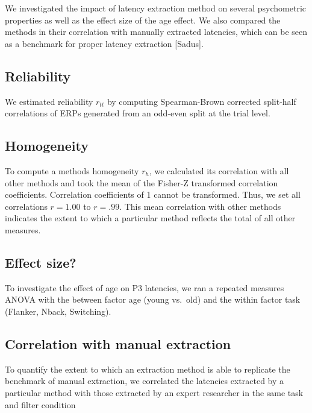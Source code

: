 \documentclass[
  man,floatsintext]{apa7}
\begin{document}
We investigated the impact of latency extraction method on several psychometric properties as well as the effect size of the age effect. We also compared the methods in their correlation with manually extracted latencies, which can be seen as a benchmark for proper latency extraction {[}Sadus{]}.

\hypertarget{reliability}{%
\subsection{Reliability}\label{reliability}}

We estimated reliability \(r_{tt}\) by computing Spearman-Brown corrected split-half correlations of ERPs generated from an odd-even split at the trial level.

\hypertarget{homogeneity}{%
\subsection{Homogeneity}\label{homogeneity}}

To compute a methods homogeneity \(r_h\), we calculated its correlation with all other methods and took the mean of the Fisher-Z transformed correlation coefficients. Correlation coefficients of 1 cannot be transformed. Thus, we set all correlations \(r = 1.00\) to \(r = .99\). This mean correlation with other methods indicates the extent to which a particular method reflects the total of all other measures.

\hypertarget{effect-size}{%
\subsection{Effect size?}\label{effect-size}}

To investigate the effect of age on P3 latencies, we ran a repeated measures ANOVA with the between factor age (young vs.~old) and the within factor task (Flanker, Nback, Switching).

\hypertarget{correlation-with-manual-extraction}{%
\subsection{Correlation with manual extraction}\label{correlation-with-manual-extraction}}

To quantify the extent to which an extraction method is able to replicate the benchmark of manual extraction, we correlated the latencies extracted by a particular method with those extracted by an expert researcher in the same task and filter condition
\end{document}
